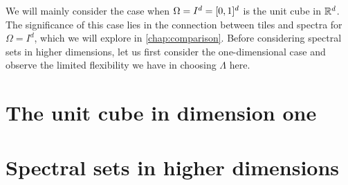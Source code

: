 \documentclass[../thesis.tex]{subfiles}
\begin{document}
We will mainly consider the case when $\Omega=I^d=[0,1]^d$ is the unit cube in $\mathbb{R}^d$. The significance of this case lies in the connection between tiles and spectra for $\Omega=I^d$, which we will explore in \cref{chap:comparison}. Before considering spectral sets in higher dimensions, let us first consider the one-dimensional case and observe the limited flexibility we have in choosing $\Lambda$ here.

\section{The unit cube in dimension one}\label{sec:complx_trig_1d}





\section{Spectral sets in higher dimensions}\label{sec:spec_higher_dim}
    
\end{document}
